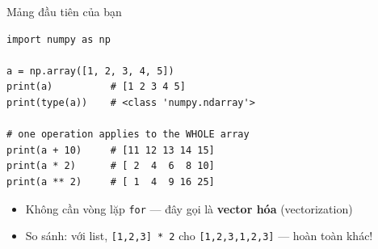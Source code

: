 \documentclass[11pt]{beamer}
\begin{document}
\begin{frame}[fragile]{Mảng đầu tiên của bạn}
\begin{lstlisting}
import numpy as np

a = np.array([1, 2, 3, 4, 5])
print(a)          # [1 2 3 4 5]
print(type(a))    # <class 'numpy.ndarray'>

# one operation applies to the WHOLE array
print(a + 10)     # [11 12 13 14 15]
print(a * 2)      # [ 2  4  6  8 10]
print(a ** 2)     # [ 1  4  9 16 25]
\end{lstlisting}
\begin{itemize}
  \item Không cần vòng lặp \texttt{for} --- đây gọi là \textbf{vector hóa} (vectorization)
  \item So sánh: với list, \texttt{[1,2,3] * 2} cho \texttt{[1,2,3,1,2,3]} --- hoàn toàn khác!
\end{itemize}
\end{frame}
\end{document}
